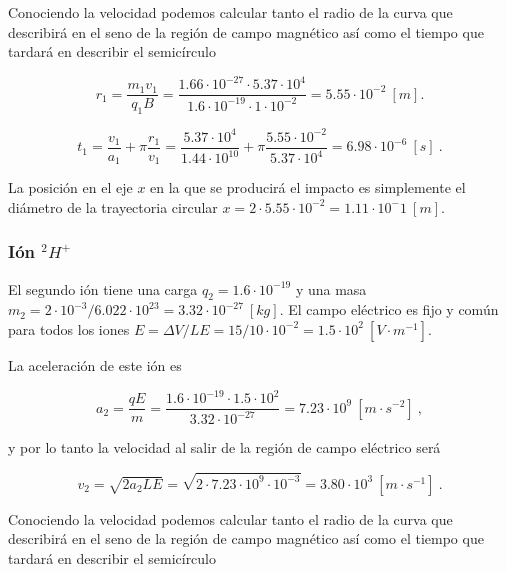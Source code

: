 \documentclass[journal]{IEEEtran}
\begin{document}
Conociendo la velocidad podemos calcular tanto el radio de la curva que describirá en el seno de la región de campo magnético así como el tiempo que tardará en describir el semicírculo

\begin{equation}
r_1 = \displaystyle\frac{m_1v_1}{q_1B} = \displaystyle\frac{1.66\cdot 10^{-27} \cdot 5.37\cdot 10^4}{1.6\cdot 10^{-19}\cdot 1 \cdot 10^{-2}} = 5.55 \cdot 10^{-2}~[m].
\end{equation}

\begin{equation}
t_1 = \displaystyle\frac{v_1}{a_1} + \pi \displaystyle\frac{r_1}{v_1} = \displaystyle\frac{5.37 \cdot 10^4}{1.44 \cdot 10^{10}} + \pi \displaystyle\frac{5.55 \cdot 10^{-2}}{5.37 \cdot 10^4} = 6.98 \cdot 10^{-6}~[s]~.
\end{equation}

La posición en el eje $x$ en la que se producirá el impacto es simplemente el diámetro de la trayectoria circular $x = 2\cdot5.55 \cdot 10^{-2} = 1.11 \cdot 10^-1~[m]$.

\subsubsection{Ión $^2H^+$}

El segundo ión tiene una carga $q_2 = 1.6\cdot 10^{-19}$ y una masa $m_2 = 2\cdot 10^{-3} / 6.022\cdot 10^{23} = 3.32\cdot 10^{-27}~[kg]$. El campo eléctrico es fijo y común para todos los iones $E = \Delta V / LE = 15 / 10\cdot 10^{-2} = 1.5\cdot 10^2~[V\cdot m^{-1}]$.

La aceleración de este ión es

\begin{equation}
a_2 = \displaystyle\frac{qE}{m} = \displaystyle\frac{1.6\cdot 10^{-19}\cdot 1.5\cdot 10^{2}}{3.32\cdot 10^{-27}} = 7.23 \cdot 10^{9}~[m\cdot s^{-2}]~,
\end{equation}

y por lo tanto la velocidad al salir de la región de campo eléctrico será

\begin{equation}
v_2 = \sqrt{2a_2LE} = \sqrt{2\cdot 7.23 \cdot 10^{9} \cdot 10^{-3}} = 3.80 \cdot 10^3~[m\cdot s^{-1}]~.
\end{equation}

Conociendo la velocidad podemos calcular tanto el radio de la curva que describirá en el seno de la región de campo magnético así como el tiempo que tardará en describir el semicírculo
\end{document}
